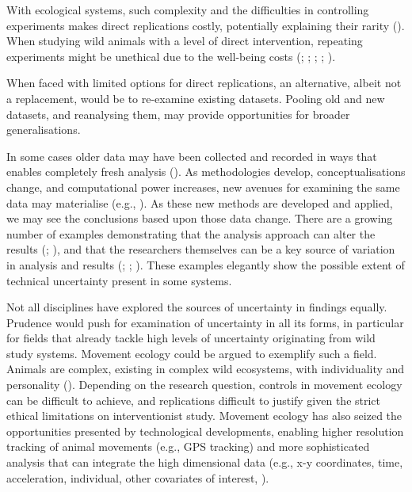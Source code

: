 \documentclass[10pt,a4paper]{article}
\begin{document}
With ecological systems, such complexity and the difficulties in controlling experiments makes direct replications costly, potentially explaining their rarity ().
When studying wild animals with a level of direct intervention, repeating experiments might be unethical due to the well-being costs (; ; ; ; ).

When faced with limited options for direct replications, an alternative, albeit not a replacement, would be to re-examine existing datasets.
Pooling old and new datasets, and reanalysing them, may provide opportunities for broader generalisations.

In some cases older data may have been collected and recorded in ways that enables completely fresh analysis ().
As methodologies develop, conceptualisations change, and computational power increases, new avenues for examining the same data may materialise (e.g., ).
As these new methods are developed and applied, we may see the conclusions based upon those data change.
There are a growing number of examples demonstrating that the analysis approach can alter the results (; ), and that the researchers themselves can be a key source of variation in analysis and results (; ; ).
These examples elegantly show the possible extent of technical uncertainty present in some systems.

Not all disciplines have explored the sources of uncertainty in findings equally.
Prudence would push for examination of uncertainty in all its forms, in particular for fields that already tackle high levels of uncertainty originating from wild study systems.
Movement ecology could be argued to exemplify such a field.
Animals are complex, existing in complex wild ecosystems, with individuality and personality ().
Depending on the research question, controls in movement ecology can be difficult to achieve, and replications difficult to justify given the strict ethical limitations on interventionist study.
Movement ecology has also seized the opportunities presented by technological developments, enabling higher resolution tracking of animal movements (e.g., GPS tracking) and more sophisticated analysis that can integrate the high dimensional data (e.g., x-y coordinates, time, acceleration, individual, other covariates of interest, ).
\end{document}

